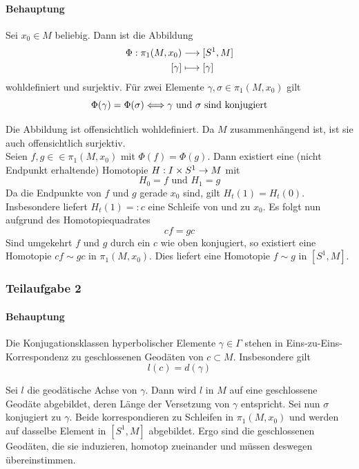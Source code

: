 \documentclass{book}
\begin{document}
\paragraph{Behauptung} Sei $x_0 \in M$ beliebig. Dann ist die Abbildung
\begin{align*}
\Phi : \pi_1(M,x_0) & \overset{}{\longrightarrow} [S^1, M]\\
[\gamma] & \longmapsto [\gamma]
\end{align*}
wohldefiniert und surjektiv. Für zwei Elemente $\gamma,\sigma \in \pi_1(M,x_0)$ gilt
\[ \Phi(\gamma) = \Phi(\sigma) \overset{}{\Longleftrightarrow} \gamma \text{ und }\sigma  \text{ sind konjugiert}\]
\begin{Beweis}{}
	Die Abbildung ist offensichtlich wohldefiniert. Da $M$ zusammenhängend ist, ist sie auch offensichtlich surjektiv.\\
	Seien $f,g \in \in \pi_1(M,x_0)$ mit $\Phi(f) = \Phi(g)$. Dann existiert eine (nicht Endpunkt erhaltende) Homotopie $H : I \times S^1 \overset{}{\rightarrow} M$ mit
	\[ H_0 = f \text{ und } H_1 = g \]
	Da die Endpunkte von $f$ und $g$ gerade $x_0$ sind, gilt $H_t(1) = H_t(0)$. Insbesondere liefert $H_t(1) =:c$ eine Schleife von und zu $x_0$. Es folgt nun aufgrund des Homotopiequadrates
	\[ c f = gc \]
	Sind umgekehrt $f$ und $g$ durch ein $c$ wie oben konjugiert, so existiert eine Homotopie $cf \sim gc$ in $\pi_1(M,x_0)$. Dies liefert eine Homotopie $f\sim g$ in $[S^1, M]$.
\end{Beweis}

\subsubsection{Teilaufgabe 2}
\paragraph{Behauptung} Die Konjugationsklassen hyperbolischer Elemente $\gamma \in \Gamma$ stehen in Eins-zu-Eins-Korrespondenz zu geschlossenen Geodäten von $c\subset M$. Insbesondere gilt
\[ l(c) = d(\gamma) \]
\begin{Beweis}{}
	Sei $l$ die geodätische Achse von $\gamma$. Dann wird $l$ in $M$ auf eine geschlossene Geodäte abgebildet, deren Länge der Versetzung von $\gamma$ entspricht. Sei nun $\sigma$ konjugiert zu $\gamma$. Beide korrespondieren zu Schleifen in $\pi_1(M, x_0)$ und werden auf dasselbe Element in $[S^1, M]$ abgebildet. Ergo sind die geschlossenen Geodäten, die sie induzieren, homotop zueinander und müssen deswegen übereinstimmen.
\end{Beweis}
\end{document}
